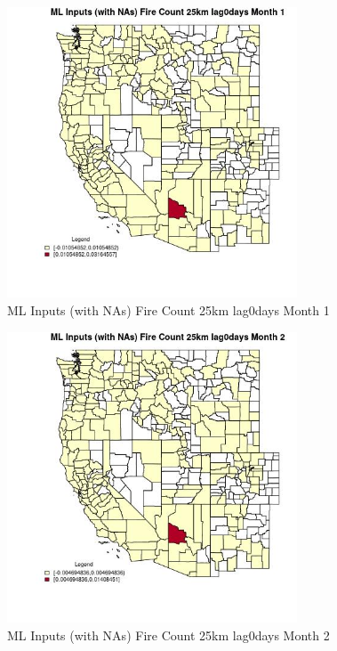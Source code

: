 \clearpage 

\begin{figure} 
\centering  
\includegraphics[width=0.77\textwidth]{Code_Outputs/Report_ML_input_PM25_Step4_part_e_de_duplicated_aves_compiled_2019-05-21wNAs_CountyFire_Count_25km_lag0daysmedianMonth1.jpg} 
\caption{\label{fig:Report_ML_input_PM25_Step4_part_e_de_duplicated_aves_compiled_2019-05-21wNAsCountyFire_Count_25km_lag0daysmedianMonth1}ML Inputs (with NAs) Fire Count 25km lag0days Month 1} 
\end{figure} 
 

\begin{figure} 
\centering  
\includegraphics[width=0.77\textwidth]{Code_Outputs/Report_ML_input_PM25_Step4_part_e_de_duplicated_aves_compiled_2019-05-21wNAs_CountyFire_Count_25km_lag0daysmedianMonth2.jpg} 
\caption{\label{fig:Report_ML_input_PM25_Step4_part_e_de_duplicated_aves_compiled_2019-05-21wNAsCountyFire_Count_25km_lag0daysmedianMonth2}ML Inputs (with NAs) Fire Count 25km lag0days Month 2} 
\end{figure} 
 

